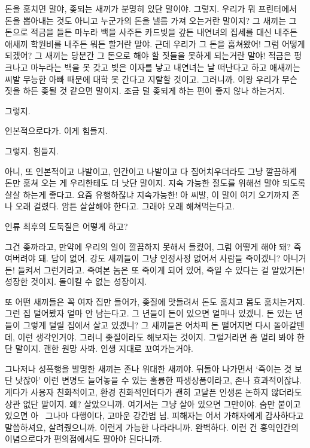\documentclass[a5paper,10pt, twoside, openright]{memoir}
\begin{document}
	돈을 훔치면 말야, 좆되는 새끼가 분명히 있단 말이야. 그렇지. 우리가 뭐 프린터에서 돈을 뽑아내는 것도 아니고 누군가의 돈을 낼름 가져 오는거란 말이지? 그 새끼는 그 돈으로 적금을 들든 마누라 백을 사주든 카드빚을 갚든 내연녀의 집세를 대신 내주든 애새끼 학원비를 내주든 뭐든 할거란 말야. 근데 우리가 그 돈을 훔쳐왔어! 그럼 어떻게 되겠어? 그 새끼는 당분간 그 돈으로 해야 할 짓들을 못하게 되는거란 말야! 적금은 펑크나고 마누라는 백을 못 갖고 빚은 이자를 낳고 내연녀는 날 떠난다고 하고 애새끼는 씨발 무능한 아빠 때문에 대학 못 간다고 지랄할 것이고. 그러니까. 이왕 우리가 무슨 짓을 하든 좆될 것 같으면 말이지. 조금 덜 좆되게 하는 편이 좋지 않나 하는거지. 
	
	그렇지. 
	
	인본적으로다가. 이게 힘들지. 
	
	그렇지. 힘들지. 
	
	아니, 또 인본적이고 나발이고, 인간이고 나발이고 다 집어치우더라도 그냥 깔끔하게 돈만 훔쳐 오는 게 우리한테도 더 낫단 말이지. 지속 가능한 절도를 위해선 말야 되도록 살살 하는게 좋다고. 요즘 유행하잖냐 지속가능한! 아 씨발, 이 말이 여기 오기까지 존나 오래 걸렸다. 암튼 살살해야 한다고. 그래야 오래 해쳐먹는다고. 
	
	인류 최후의 도둑질은 어떻게 하고? 

	그건 좆까라고, 만약에 우리의 일이 깔끔하지 못해서 들켰어, 그럼 어떻게 해야 돼? 죽여버려야 돼. 답이 없어. 강도 새끼들이 그냥 인정사정 없어서 사람들 죽이겠니? 아니거든! 들켜서 그런거라고. 죽여본 놈은 또 죽이게 되어 있어, 죽일 수 있다는 걸 알았거든! 성장한 것이지. 돌이킬 수 없는 성장이지.

	또 어떤 새끼들은 꼭 여자 집만 들어가, 좆질에 맛들려서 돈도 훔치고 몸도 훔치는거지. 그런 집 털어봤자 얼마 안 남는다고. 그 년들이 돈이 있으면 얼마나 있겠니. 돈 있는 년들이 그렇게 털릴 집에서 살고 있겠니? 그 새끼들은 어차피 돈 떨어지면 다시 돌아갈텐데, 이런 생각인거야. 그러니 좆질이라도 해보자는 것이지. 그럴거라면 좀 멀리 봐야 한단 말이지. 괜한 원망 사봐. 인생 지대로 꼬여가는거야. 

	그나저나 성폭행을 발명한 새끼는 존나 위대한 새끼야. 뒤돌아 나가면서 ‘죽이는 것 보단 낫잖아’ 이런 변명도 늘어놓을 수 있는 훌륭한 파생상품이라고, 존나 효과적이잖냐. 게다가 사용자 친화적이고, 환경 친화적인데다가 괜히 고달픈 인생론 논하지 않더라도 상관 없단 말이지. 왜? 살았으니까. 여기서는 그냥 살아 있으면 그만이야. 숨만 붙이고 있으면 아~ 그나마 다행이다, 고마운 강간범 님. 피해자는 어서 가해자에게 감사하다고 말씀하셔요, 살려줬으니까. 이런게 가능한 나라라니까. 완벽하다. 이런 건 홍익인간의 이념으로다가 편의점에서도 팔아야 된다니까. 
\end{document}
